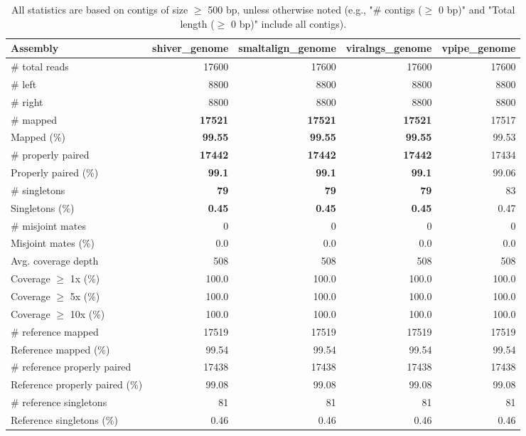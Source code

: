 \documentclass[12pt,a4paper]{article}
\begin{document}
\begin{table}[ht]
\begin{center}
\caption{All statistics are based on contigs of size $\geq$ 500 bp, unless otherwise noted (e.g., "\# contigs ($\geq$ 0 bp)" and "Total length ($\geq$ 0 bp)" include all contigs).}
\begin{tabular}{|l*{4}{|r}|}
\hline
Assembly & shiver\_genome & smaltalign\_genome & viralngs\_genome & vpipe\_genome \\ \hline
\# total reads & 17600 & 17600 & 17600 & 17600 \\ \hline
\# left & 8800 & 8800 & 8800 & 8800 \\ \hline
\# right & 8800 & 8800 & 8800 & 8800 \\ \hline
\# mapped & {\bf 17521} & {\bf 17521} & {\bf 17521} & 17517 \\ \hline
Mapped (\%) & {\bf 99.55} & {\bf 99.55} & {\bf 99.55} & 99.53 \\ \hline
\# properly paired & {\bf 17442} & {\bf 17442} & {\bf 17442} & 17434 \\ \hline
Properly paired (\%) & {\bf 99.1} & {\bf 99.1} & {\bf 99.1} & 99.06 \\ \hline
\# singletons & {\bf 79} & {\bf 79} & {\bf 79} & 83 \\ \hline
Singletons (\%) & {\bf 0.45} & {\bf 0.45} & {\bf 0.45} & 0.47 \\ \hline
\# misjoint mates & 0 & 0 & 0 & 0 \\ \hline
Misjoint mates (\%) & 0.0 & 0.0 & 0.0 & 0.0 \\ \hline
Avg. coverage depth & 508 & 508 & 508 & 508 \\ \hline
Coverage $\geq$ 1x (\%) & 100.0 & 100.0 & 100.0 & 100.0 \\ \hline
Coverage $\geq$ 5x (\%) & 100.0 & 100.0 & 100.0 & 100.0 \\ \hline
Coverage $\geq$ 10x (\%) & 100.0 & 100.0 & 100.0 & 100.0 \\ \hline
\# reference mapped & 17519 & 17519 & 17519 & 17519 \\ \hline
Reference mapped (\%) & 99.54 & 99.54 & 99.54 & 99.54 \\ \hline
\# reference properly paired & 17438 & 17438 & 17438 & 17438 \\ \hline
Reference properly paired (\%) & 99.08 & 99.08 & 99.08 & 99.08 \\ \hline
\# reference singletons & 81 & 81 & 81 & 81 \\ \hline
Reference singletons (\%) & 0.46 & 0.46 & 0.46 & 0.46 \\ \hline

\end{tabular}
\end{center}
\end{table}
\end{document}
